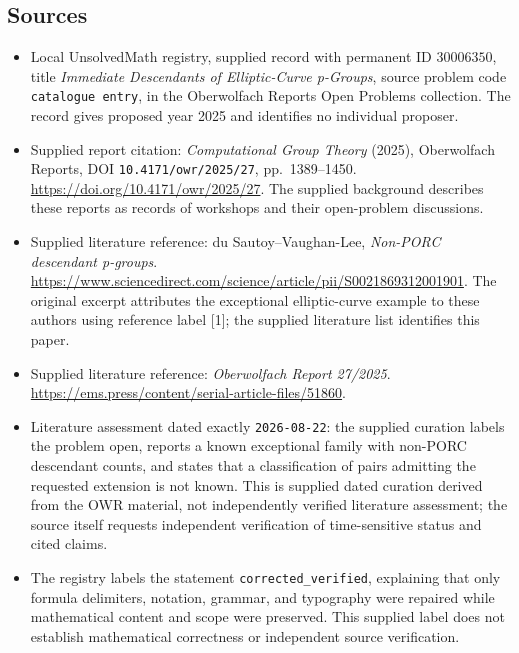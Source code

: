 \documentclass[11pt]{article}
\begin{document}
\subsection{Sources}
\begin{itemize}
\item Local UnsolvedMath registry, supplied record with permanent ID \(30006350\), title \emph{Immediate Descendants of Elliptic-Curve p-Groups}, source problem code \texttt{catalogue entry}, in the Oberwolfach Reports Open Problems collection. The record gives proposed year 2025 and identifies no individual proposer.
\item Supplied report citation: \emph{Computational Group Theory} (2025), Oberwolfach Reports, DOI \texttt{10.4171/owr/2025/27}, pp.\ 1389--1450. \url{https://doi.org/10.4171/owr/2025/27}. The supplied background describes these reports as records of workshops and their open-problem discussions.
\item Supplied literature reference: du Sautoy--Vaughan-Lee, \emph{Non-PORC descendant p-groups}. \url{https://www.sciencedirect.com/science/article/pii/S0021869312001901}. The original excerpt attributes the exceptional elliptic-curve example to these authors using reference label [1]; the supplied literature list identifies this paper.
\item Supplied literature reference: \emph{Oberwolfach Report 27/2025}. \url{https://ems.press/content/serial-article-files/51860}.
\item Literature assessment dated exactly \texttt{2026-08-22}: the supplied curation labels the problem open, reports a known exceptional family with non-PORC descendant counts, and states that a classification of pairs admitting the requested extension is not known. This is supplied dated curation derived from the OWR material, not independently verified literature assessment; the source itself requests independent verification of time-sensitive status and cited claims.
\item The registry labels the statement \texttt{corrected\_verified}, explaining that only formula delimiters, notation, grammar, and typography were repaired while mathematical content and scope were preserved. This supplied label does not establish mathematical correctness or independent source verification.
\end{itemize}
\end{document}
